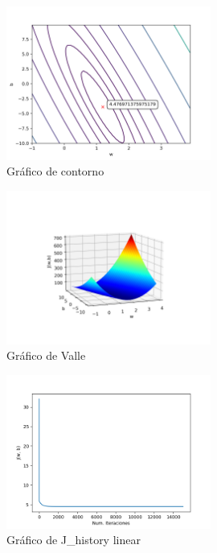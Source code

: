\documentclass[6pt]{../../shared/AiTex}
\begin{document}
\begin{figure}[H]
    \centering
    \includegraphics[width=0.6\textwidth]{imagenes/contour_plot.png}
    \caption{Gráfico de contorno}
    \label{fig:contour}
\end{figure}

\begin{figure}[H]
    \centering
    \includegraphics[width=0.6\textwidth]{imagenes/mesh.png}
    \caption{Gráfico de Valle}
    \label{fig:mesh}
\end{figure}

\begin{figure}[H]
    \centering
    \includegraphics[width=0.6\textwidth]{imagenes/J_history_linear.png}
    \caption{Gráfico de J\_history linear}
    \label{fig:history_linear}
\end{figure}
\end{document}
